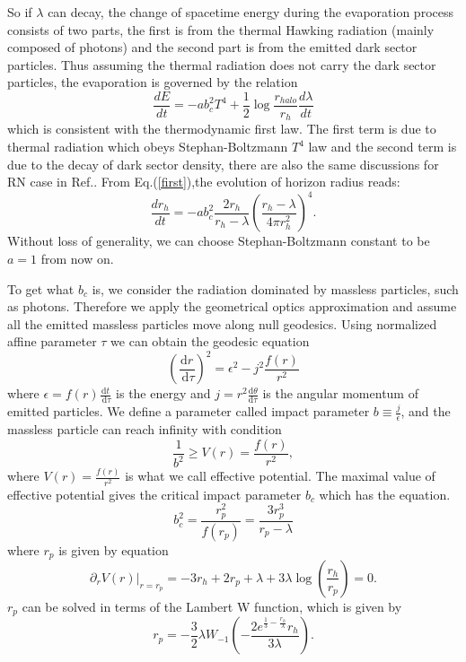 \documentclass[a4paper,11pt]{article}
\begin{document}
So if $\lambda$ can decay, the change of spacetime energy during the evaporation process consists of two parts, the first is from the thermal Hawking radiation (mainly composed of photons) and the second part is from the emitted dark sector particles.  Thus assuming the thermal radiation does not carry the dark sector particles, the evaporation is governed by the relation 
\begin{equation}\label{first}
    \frac{dE}{dt}=-a b_{c}^{2}T^{4}+\frac{1}{2}\log \frac{r_{halo}}{r_{h}} \frac{d\lambda}{dt}
\end{equation}
which is consistent with the thermodynamic first law. The first term is due to thermal radiation which obeys Stephan-Boltzmann $T^{4}$ law and the second term is due to the decay of dark sector density, there are also the same discussions for RN case in Ref.\cite{Hiscock:1990ex,Xu:2019wak}. From Eq.(\ref{first}),the evolution of horizon radius reads: 
\begin{equation}
    \frac{dr_{h}}{dt}=-a b_{c}^{2} \frac{2r_h}{r_{h}-\lambda} (\frac{r_{h}-\lambda}{4\pi r_{h}^{2}})^{4}.\label{rht}
\end{equation}
Without loss of generality, we can choose Stephan-Boltzmann constant to be $a=1$ from now on. 

To get what $b_{c}$ is, we consider the radiation dominated by massless particles, such as photons. Therefore we apply the geometrical optics approximation and assume all the emitted massless particles move along null geodesics. Using normalized affine parameter $\tau$ we can obtain the geodesic equation
\begin{equation}
	\left(\frac{\mathrm{d} r}{\mathrm{~d} \tau}\right)^{2}=\epsilon^{2}-j^{2} \frac{f(r)}{r^{2}}
\end{equation}
where $ \epsilon=f(r) \frac{\mathrm{d} t}{\mathrm{~d} \tau} $ is the energy and $ j=r^{2} \frac{\mathrm{d} \theta}{\mathrm{d} \tau} $ is the angular momentum of emitted particles. We define a parameter called impact parameter $ b\equiv\frac{j}{\epsilon} $, and the massless particle can reach infinity with condition
\begin{equation}
	\frac{1}{b^{2}}\geqslant V(r)= \frac{f(r)}{r^{2}},
\end{equation}
where $ V(r)=\frac{f(r)}{r^{2}} $ is what we call effective potential.
The maximal value of effective potential gives the critical impact parameter $b_{c}$ which has the equation. 
\begin{equation}
    b_{c}^{2}=\frac{r_{p}^{2}}{f(r_{p})}=\frac{3r_{p}^{3}}{r_{p}-\lambda}
\end{equation}
where $r_{p}$ is given by equation\cite{Gao:2023ltr}
\begin{equation}
  \partial_{r}V(r)|_{r=r_{p}}=  -3r_{h}+2r_{p}+\lambda+3\lambda \log(\frac{r_{h}}{r_{p}})=0.
\end{equation}
$r_{p}$ can be solved in terms of the Lambert W function, which is given by 
\begin{equation}
    r_{p}=-\frac{3}{2} \lambda W_{-1}(-\frac{2 e^{\frac{1}{3}-\frac{r_{h}}{\lambda}}r_{h}}{3\lambda}).
\end{equation}
\end{document}
